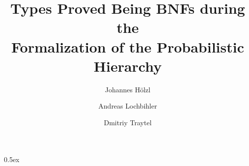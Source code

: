 \documentclass[11pt,a4paper]{article}
\begin{document}
\title{Types Proved Being BNFs during the\\Formalization of the Probabilistic
  Hierarchy} \author{Johannes H\"olzl \and Andreas Lochbihler \and Dmitriy
  Traytel}
\maketitle

\tableofcontents

\parindent 0pt\parskip 0.5ex



%
%
\end{document}

